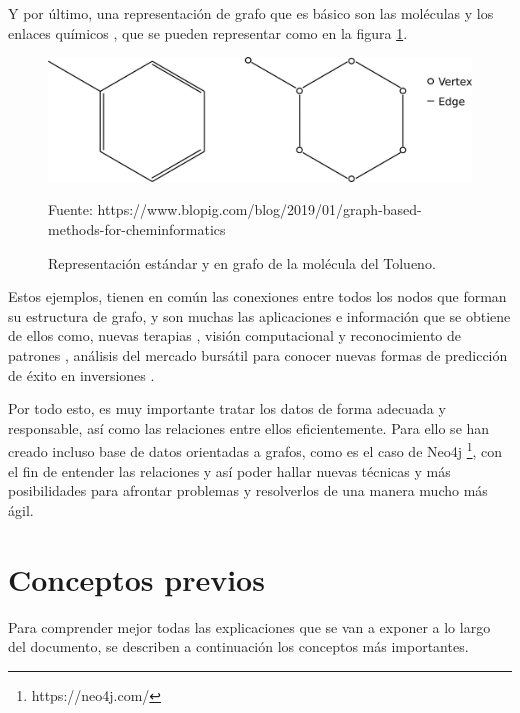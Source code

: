 Y por último, una representación de grafo que es básico son las moléculas y los enlaces químicos \cite{grafo-molecula}, que se pueden representar como en la figura \ref{fig:molecula-graph}.

 \begin{figure}[H]
	\centering
	\includegraphics[scale=0.3]{Figures/molecula-graph.pdf}
	\caption{Representación estándar y en grafo de la molécula del Tolueno.}
	\scriptsize Fuente: https://www.blopig.com/blog/2019/01/graph-based-methods-for-cheminformatics
	\label{fig:molecula-graph}
\end{figure}

Estos ejemplos, tienen en común las conexiones entre todos los nodos que forman su estructura de grafo, y son muchas las aplicaciones e información que se obtiene de ellos como, nuevas terapias \cite{top-molec}, visión computacional y reconocimiento de patrones \cite{mcp-compVision}, análisis del mercado bursátil para conocer nuevas formas de predicción de éxito en inversiones \cite{vid-graf-ai}.\newline

Por todo esto, es muy importante tratar los datos de forma adecuada y responsable, así como las relaciones entre ellos eficientemente. Para ello se han creado incluso base de datos orientadas a grafos, como es el caso de Neo4j \footnote{https://neo4j.com/}, con el fin de entender las relaciones y así poder hallar nuevas técnicas y más posibilidades para afrontar problemas y resolverlos de una manera mucho más ágil.


\section{Conceptos previos}
Para comprender mejor todas las explicaciones que se van a exponer a lo largo del documento, se describen a continuación los conceptos más importantes.

